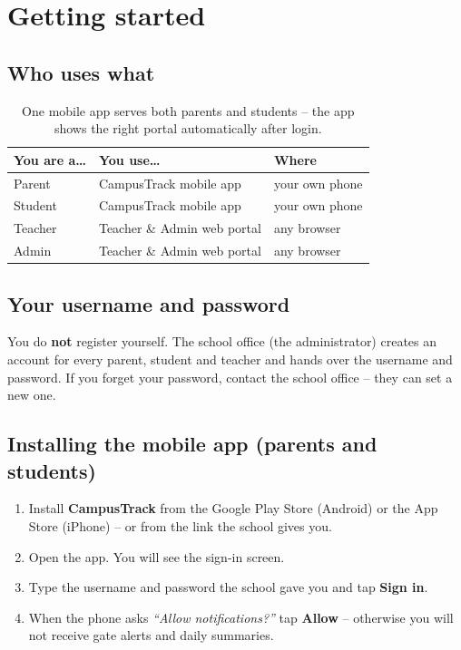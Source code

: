 \chapter{Getting started}

\section{Who uses what}

\begin{table}[H]
\centering
\begin{tabular}{lll}
\toprule
\textbf{You are a\ldots} & \textbf{You use\ldots} & \textbf{Where} \\
\midrule
Parent  & CampusTrack mobile app & your own phone \\
Student & CampusTrack mobile app & your own phone \\
Teacher & Teacher \& Admin web portal & any browser \\
Admin   & Teacher \& Admin web portal & any browser \\
\bottomrule
\end{tabular}
\caption{One mobile app serves both parents and students -- the app
shows the right portal automatically after login.}
\end{table}

\section{Your username and password}

You do \textbf{not} register yourself. The school office (the
administrator) creates an account for every parent, student and teacher
and hands over the username and password. If you forget your password,
contact the school office -- they can set a new one.

\section{Installing the mobile app (parents and students)}

\begin{enumerate}[itemsep=2pt]
  \item Install \textbf{CampusTrack} from the Google Play Store
        (Android) or the App Store (iPhone) -- or from the link the
        school gives you.
  \item Open the app. You will see the sign-in screen.
  \item Type the username and password the school gave you and tap
        \textbf{Sign in}.
  \item When the phone asks \emph{``Allow notifications?''} tap
        \textbf{Allow} -- otherwise you will not receive gate alerts and
        daily summaries.
\end{enumerate}

